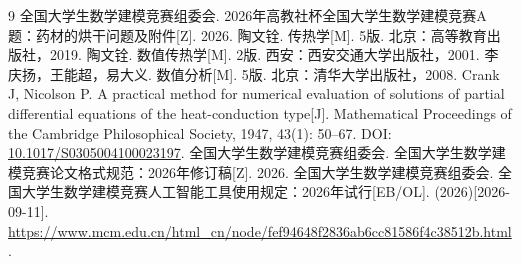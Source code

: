 \begin{thebibliography}{9}
 全国大学生数学建模竞赛组委会. 2026年高教社杯全国大学生数学建模竞赛A题：药材的烘干问题及附件[Z]. 2026.
 陶文铨. 传热学[M]. 5版. 北京：高等教育出版社，2019.
 陶文铨. 数值传热学[M]. 2版. 西安：西安交通大学出版社，2001.
 李庆扬，王能超，易大义. 数值分析[M]. 5版. 北京：清华大学出版社，2008.
 Crank J, Nicolson P. A practical method for numerical evaluation of solutions of partial differential equations of the heat-conduction type[J]. Mathematical Proceedings of the Cambridge Philosophical Society, 1947, 43(1): 50--67. DOI: \href{https://doi.org/10.1017/S0305004100023197}{10.1017/S0305004100023197}.
 全国大学生数学建模竞赛组委会. 全国大学生数学建模竞赛论文格式规范：2026年修订稿[Z]. 2026.
 全国大学生数学建模竞赛组委会. 全国大学生数学建模竞赛人工智能工具使用规定：2026年试行[EB/OL]. (2026)[2026-09-11]. \url{https://www.mcm.edu.cn/html_cn/node/fef94648f2836ab6cc81586f4c38512b.html}.
\end{thebibliography}
